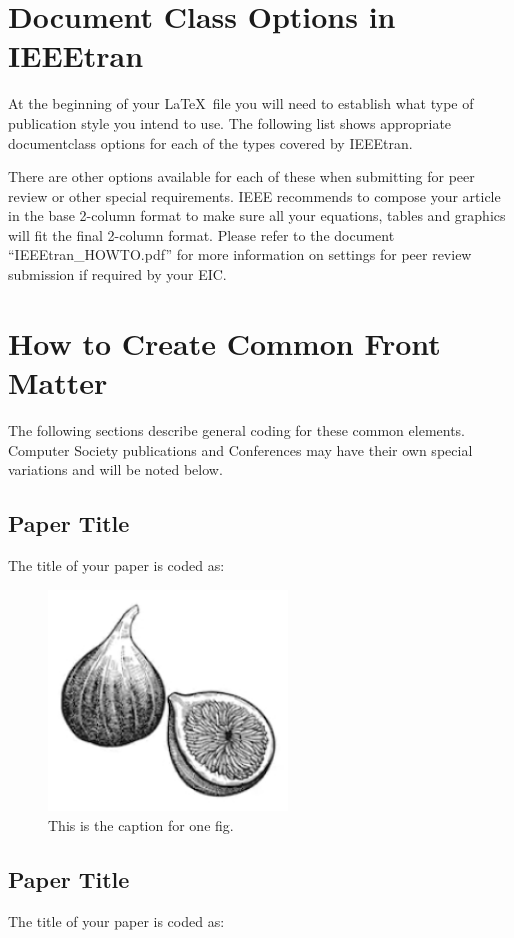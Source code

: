 \documentclass[lettersize,journal]{IEEEtran}
\begin{document}
\section{Document Class Options in IEEEtran}
\noindent At the beginning of your \LaTeX\ file you will need to establish what type of publication style you intend to use. The following list shows appropriate documentclass options for each of the types covered by IEEEtran.

There are other options available for each of these when submitting for peer review or other special requirements. IEEE recommends to compose your article in the base 2-column format to make sure all your equations, tables and graphics will fit the final 2-column format. Please refer to the document ``IEEEtran\_HOWTO.pdf'' for more information on settings for peer review submission if required by your EIC.

\section{How to Create Common Front Matter}
\noindent The following sections describe general coding for these common elements. Computer Society publications and Conferences may have their own special variations and will be noted below.
\subsection{Paper Title}
\noindent The title of your paper is coded as:

\begin{figure}[!t]
\centering
\includegraphics[width=2.5in]{fig1}
\caption{This is the caption for one fig.}
\label{fig1}
\end{figure}

\subsection{Paper Title}
\noindent The title of your paper is coded as:
\end{document}
